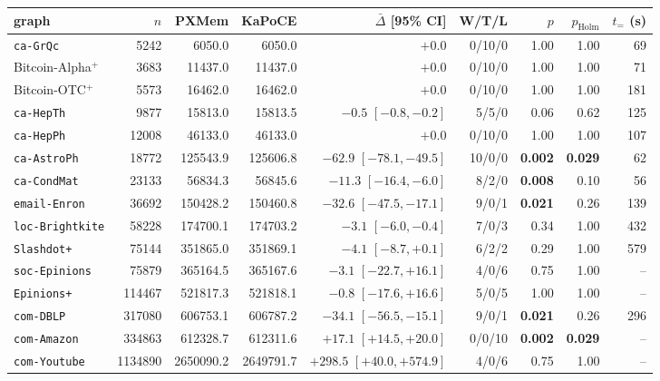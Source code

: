 \begin{tabular}{lrrrrrrrr}
\toprule
graph & $n$ & PXMem & KaPoCE & $\bar\Delta$ [95\% CI] & W/T/L & $p$ & $p_{\mathrm{Holm}}$ & $t_{=}$ (s) \\
\midrule
\texttt{ca-GrQc} & \num{5242} & \num{6050.0} & \num{6050.0} & $+0.0$  & 0/10/0 & 1.00 & 1.00 & 69 \\
Bitcoin-Alpha$^+$ & \num{3683} & \num{11437.0} & \num{11437.0} & $+0.0$  & 0/10/0 & 1.00 & 1.00 & 71 \\
Bitcoin-OTC$^+$ & \num{5573} & \num{16462.0} & \num{16462.0} & $+0.0$  & 0/10/0 & 1.00 & 1.00 & 181 \\
\texttt{ca-HepTh} & \num{9877} & \num{15813.0} & \num{15813.5} & $-0.5$ $[-0.8, -0.2]$ & 5/5/0 & 0.06 & 0.62 & 125 \\
\texttt{ca-HepPh} & \num{12008} & \num{46133.0} & \num{46133.0} & $+0.0$  & 0/10/0 & 1.00 & 1.00 & 107 \\
\texttt{ca-AstroPh} & \num{18772} & \num{125543.9} & \num{125606.8} & $-62.9$ $[-78.1, -49.5]$ & 10/0/0 & \textbf{0.002} & \textbf{0.029} & 62 \\
\texttt{ca-CondMat} & \num{23133} & \num{56834.3} & \num{56845.6} & $-11.3$ $[-16.4, -6.0]$ & 8/2/0 & \textbf{0.008} & 0.10 & 56 \\
\texttt{email-Enron} & \num{36692} & \num{150428.2} & \num{150460.8} & $-32.6$ $[-47.5, -17.1]$ & 9/0/1 & \textbf{0.021} & 0.26 & 139 \\
\texttt{loc-Brightkite} & \num{58228} & \num{174700.1} & \num{174703.2} & $-3.1$ $[-6.0, -0.4]$ & 7/0/3 & 0.34 & 1.00 & 432 \\
\texttt{Slashdot+} & \num{75144} & \num{351865.0} & \num{351869.1} & $-4.1$ $[-8.7, +0.1]$ & 6/2/2 & 0.29 & 1.00 & 579 \\
\texttt{soc-Epinions} & \num{75879} & \num{365164.5} & \num{365167.6} & $-3.1$ $[-22.7, +16.1]$ & 4/0/6 & 0.75 & 1.00 & -- \\
\texttt{Epinions+} & \num{114467} & \num{521817.3} & \num{521818.1} & $-0.8$ $[-17.6, +16.6]$ & 5/0/5 & 1.00 & 1.00 & -- \\
\texttt{com-DBLP} & \num{317080} & \num{606753.1} & \num{606787.2} & $-34.1$ $[-56.5, -15.1]$ & 9/0/1 & \textbf{0.021} & 0.26 & 296 \\
\texttt{com-Amazon} & \num{334863} & \num{612328.7} & \num{612311.6} & $+17.1$ $[+14.5, +20.0]$ & 0/0/10 & \textbf{0.002} & \textbf{0.029} & -- \\
\texttt{com-Youtube} & \num{1134890} & \num{2650090.2} & \num{2649791.7} & $+298.5$ $[+40.0, +574.9]$ & 4/0/6 & 0.75 & 1.00 & -- \\
\bottomrule
\end{tabular}

